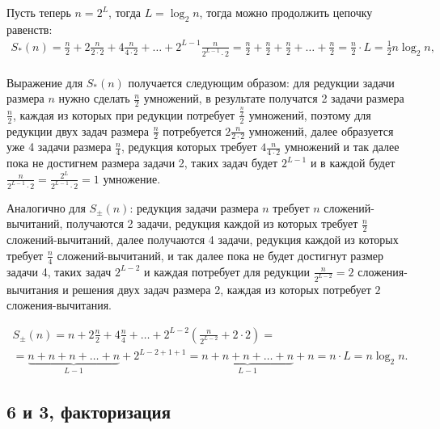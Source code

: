 Пусть теперь $n = 2^L$, тогда $L = \log_2 n$, тогда можно продолжить цепочку равенств:
\begin{gather*}
    S_*(n)
    = \frac{n}{2} + 2 \frac{n}{2 \cdot 2} + 4 \frac{n}{4 \cdot 2} + \dots + 2^{L-1} \frac{n}{2^{L-1} \cdot 2}
    = \frac{n}{2} + \frac{n}{2} + \frac{n}{2} + \dots + \frac{n}{2}
    = \frac{n}{2} \cdot L
    = \frac{1}{2} n \log_2 n , \\
\end{gather*}

Выражение для $S_*(n)$ получается следующим образом: для редукции задачи размера $n$ нужно сделать $\frac{n}{2}$ умножений,
в результате получатся 2 задачи размера $\frac{n}{2}$, каждая из которых при редукции потребует
$\frac{\frac{n}{2}}{2}$ умножений, поэтому для редукции двух задач размера $\frac{n}{2}$ потребуется $2 \frac{n}{2 \cdot 2}$ умножений,
далее образуется уже 4 задачи размера $\frac{n}{4}$, редукция которых требует $4 \frac{n}{4 \cdot 2}$ умножений и так далее пока не достигнем размера
задачи 2, таких задач будет $2^{L-1}$ и в каждой будет $\frac{n}{2^{L-1} \cdot 2} = \frac{2^L}{2^{L-1} \cdot 2} = 1$ умножение. 

Аналогично для $S_\pm(n)$: редукция задачи размера $n$ требует $n$ сложений-вычитаний, получаются 2 задачи, редукция каждой из которых требует
$\frac{n}{2}$ сложений-вычитаний, далее получаются 4 задачи, редукция каждой из которых требует $\frac{n}{4}$ сложений-вычитаний, и так далее пока не будет
достигнут размер задачи 4, таких задач $2^{L-2}$ и каждая потребует для редукции $\frac{n}{2^{L-2}} = 2$ сложения-вычитания и решения двух задач
размера 2, каждая из которых потребует $2$ сложения-вычитания.

\begin{multline*}
    S_\pm(n)
    = n + 2 \frac{n}{2} + 4 \frac{n}{4} + \dots + 2^{L-2} \left ( \frac{n}{2^{L-2}} + 2 \cdot 2 \right ) = \\
    = \underbrace{n + n + n + \dots + n}_{L-1} + 2^{L-2+1+1}
    = \underbrace{n + n + n + \dots + n}_{L-1} + n
    = n \cdot L
    = n \log_2 n .
\end{multline*}

\subsection{6 и 3, факторизация}


